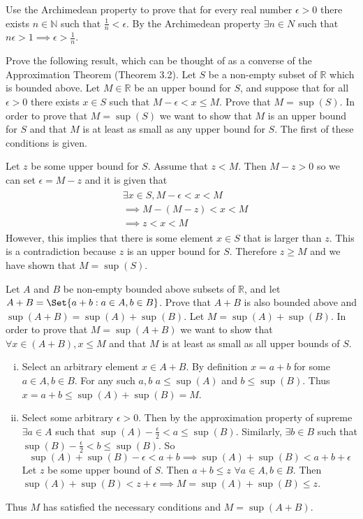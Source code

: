 \documentclass[paper=a4, fontsize=11pt]{jhwhw} %
\begin{document}
Use the Archimedean property to prove that for every real number $\epsilon > 0$ there exists $n\in \mathbb N$ such that $\frac{1}{n} < \epsilon$. 
\solution
By the Archimedean property $\exists n\in N$ such that $n\epsilon > 1 \implies \epsilon > \frac{1}{n}$.

Prove the following result, which can be thought of as a converse of the Approximation Theorem (Theorem 3.2). Let $S$ be a non-empty subset of $\mathbb R$ which is bounded above. Let $M\in \mathbb R$ be an upper bound for $S$, and suppose that for all $\epsilon > 0$ there exists $x\in S$ such that $M-\epsilon < x\le M$. Prove that $M = \sup(S)$. 
\solution
In order to prove that $M = \sup(S)$ we want to show that $M$ is an upper bound for $S$ and that $M$ is at least as small as any upper bound for $S$. The first of these conditions is given.

Let $z$ be some upper bound for $S$. Assume that $z < M$. Then $M - z > 0$ so we can set $\epsilon = M - z$ and it is given that 
\begin{align}
    \begin{split}
        &\exists x \in S, M-\epsilon < x < M\\
        &\implies M - ( M - z) < x < M\\
        &\implies z < x < M
    \end{split}
\end{align}
However, this implies that there is some element $x\in S$ that is larger than $z$. This is a contradiction because $z$ is an upper bound for $S$. Therefore $z \ge M$ and we have shown that $M = \sup(S)$. 

Let $A$ and $B$ be non-empty bounded above subsets of $\mathbb R$, and let $A + B = \Set{a + b:a\in A, b\in B}$. Prove that $A + B$ is also bounded above and $\sup(A+B) = \sup(A) + \sup(B)$. 
\solution
Let $M = \sup(A) + \sup(B)$. In order to prove that $M = \sup(A+B)$ we want to show that $\forall x \in (A+B), x\le M$ and that $M$ is at least as small as all upper bounds of $S$. 
\begin{enumerate}[i.]
    \item Select an arbitrary element $x\in A+B$. By definition $x = a+b$ for some $a\in A, b\in B$. For any such $a, b$ $a\le \sup(A)$ and $b\le \sup(B)$. Thus $x = a + b \le \sup(A) + \sup(B) = M$.

    \item Select some arbitrary $\epsilon > 0$. Then by the approximation property of supreme $\exists a\in A$ such that $\sup(A) - \frac{\epsilon}{2} < a \le \sup(B)$. Similarly, $\exists b\in B$ such that $\sup(B) - \frac{\epsilon}{2} < b \le \sup(B)$. So
        $$\sup(A) + \sup(B) - \epsilon < a +b\implies \sup(A) + \sup(B) < a + b + \epsilon$$
        Let $z$ be some upper bound of $S$. Then $a + b \le z$ $\forall a\in A, b\in B$. Then $\sup(A) + \sup(B) < z + \epsilon \implies M = \sup(A) + \sup(B) \le z$. 
\end{enumerate}
Thus $M$ has satisfied the necessary conditions and $M = \sup(A+B)$. 
\end{document}
